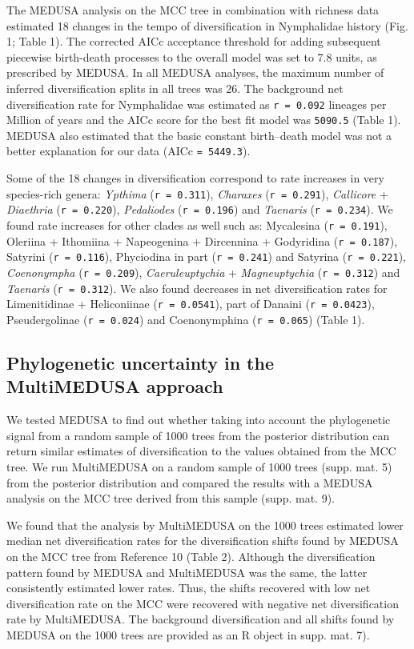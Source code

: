 \documentclass[10pt]{article}
\begin{document}
The MEDUSA analysis on the MCC tree in combination with richness data
estimated 18 changes in the tempo of diversification in Nymphalidae
history (Fig. 1; Table 1). The corrected AICc acceptance threshold for
adding subsequent piecewise birth-death processes to the overall model
was set to 7.8 units, as prescribed by MEDUSA. In all MEDUSA analyses,
the maximum number of inferred diversification splits in all trees was
26. The background net diversification rate for Nymphalidae was
estimated as \texttt{r = 0.092} lineages per Million of years and the
AICc score for the best fit model was \texttt{5090.5} (Table 1). MEDUSA
also estimated that the basic constant birth--death model was not a
better explanation for our data (AICc \texttt{= 5449.3}).

Some of the 18 changes in diversification correspond to rate increases
in very species-rich genera: \emph{Ypthima} (\texttt{r = 0.311}),
\emph{Charaxes} (\texttt{r = 0.291}), \emph{Callicore} +
\emph{Diaethria} (\texttt{r = 0.220}), \emph{Pedaliodes}
(\texttt{r = 0.196}) and \emph{Taenaris} (\texttt{r = 0.234}). We found
rate increases for other clades as well such as: Mycalesina
(\texttt{r = 0.191}), Oleriina + Ithomiina + Napeogenina + Dircennina +
Godyridina (\texttt{r = 0.187}), Satyrini (\texttt{r = 0.116}),
Phyciodina in part (\texttt{r = 0.241}) and Satyrina
(\texttt{r = 0.221}), \emph{Coenonympha} (\texttt{r = 0.209}),
\emph{Caeruleuptychia} + \emph{Magneuptychia} (\texttt{r = 0.312}) and
\emph{Taenaris} (\texttt{r = 0.312}). We also found decreases in net
diversification rates for Limenitidinae + Heliconiinae
(\texttt{r = 0.0541}), part of Danaini (\texttt{r = 0.0423}),
Pseudergolinae (\texttt{r = 0.024}) and Coenonymphina
(\texttt{r = 0.065}) (Table 1).

\subsection*{Phylogenetic uncertainty in the MultiMEDUSA approach}

We tested MEDUSA to find out whether taking into account the
phylogenetic signal from a random sample of 1000 trees from the
posterior distribution can return similar estimates of diversification
to the values obtained from the MCC tree. We run MultiMEDUSA on a random
sample of 1000 trees (supp. mat. 5) from the posterior distribution and
compared the results with a MEDUSA analysis on the MCC tree derived from
this sample (supp. mat. 9).

We found that the analysis by MultiMEDUSA on the 1000 trees estimated
lower median net diversification rates for the diversification shifts
found by MEDUSA on the MCC tree from Reference 10 (Table 2). Although
the diversification pattern found by MEDUSA and MultiMEDUSA was the
same, the latter consistently estimated lower rates. Thus, the shifts
recovered with low net diversification rate on the MCC were recovered
with negative net diversification rate by MultiMEDUSA. The background
diversification and all shifts found by MEDUSA on the 1000 trees are
provided as an R object in supp. mat. 7).
\end{document}
